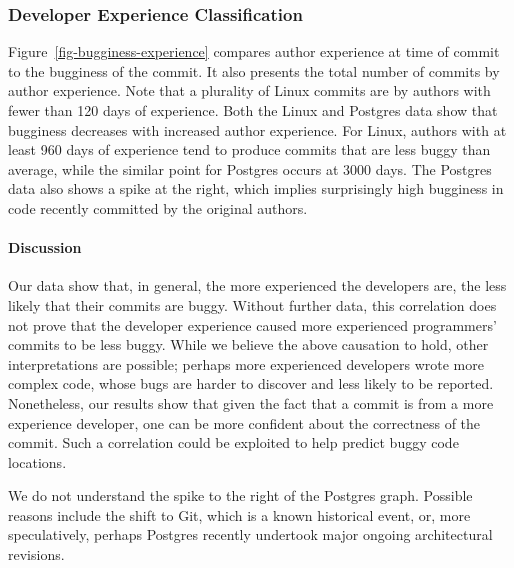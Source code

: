 
\subsubsection{Developer Experience Classification}

Figure~\ref{fig-bugginess-experience} compares author experience at
time of commit to the bugginess of the commit. It also presents the
total number of commits by author experience. Note that a plurality of
Linux commits are by authors with fewer than 120 days of experience.
Both the Linux and Postgres data show that bugginess decreases with
increased author experience. For Linux, authors with at least 960 days
of experience tend to produce commits that are less buggy than
average, while the similar point for Postgres occurs at 3000 days.
The Postgres data also shows a spike at the right, which implies
surprisingly high bugginess in code recently committed by the original
authors.

\paragraph{Discussion}
Our data show that, in general, the more experienced the developers are, the less likely that their commits are buggy.
Without further data, this correlation does not prove that the developer experience caused more 
experienced programmers' commits to be less buggy. 
While we believe the above causation to hold, other interpretations are possible; perhaps more experienced developers wrote 
more complex code, whose bugs are harder to discover and less likely to be reported. 
Nonetheless, our results show that given the fact that a commit is from a more experience developer, 
one can be more confident about the correctness of the commit. Such a correlation could be exploited 
to help predict buggy code locations.

We do not understand the spike to the right of the Postgres graph.
Possible reasons include the shift to Git, which is a known historical
event, or, more speculatively, perhaps Postgres recently undertook
major ongoing architectural revisions.

